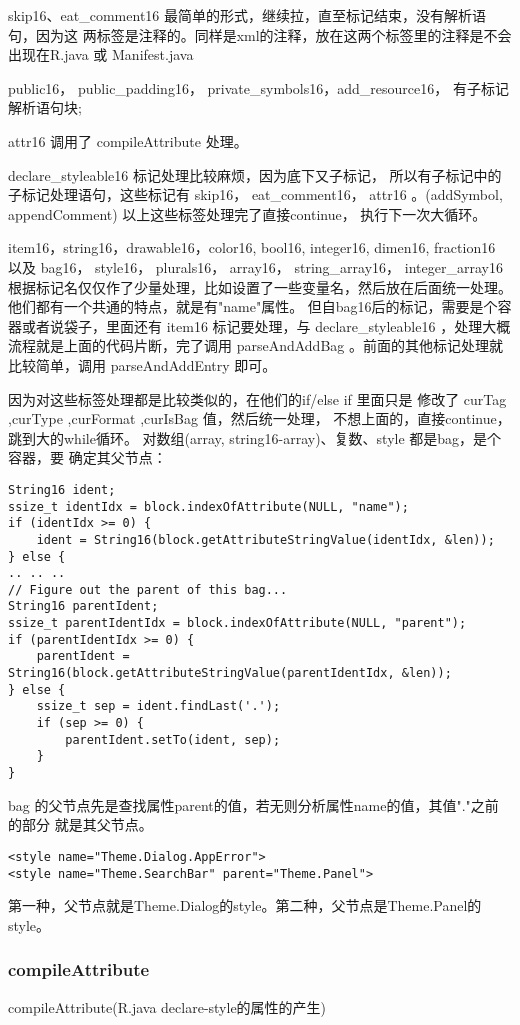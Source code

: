\documentclass[a4paper,11pt]{article}
\begin{document}
skip16、eat_comment16 最简单的形式，继续拉，直至标记结束，没有解析语句，因为这
两标签是注释的。同样是xml的注释，放在这两个标签里的注释是不会出现在R.java 或 Manifest.java
\par
public16， public_padding16， private_symbols16，add_resource16，
有子标记解析语句块;
\par attr16 调用了 compileAttribute 处理。
\par declare_styleable16 标记处理比较麻烦，因为底下又子标记，
所以有子标记中的子标记处理语句，这些标记有
skip16， eat_comment16， attr16 。(addSymbol, appendComment) 
以上这些标签处理完了直接continue， 执行下一次大循环。
\par
item16，string16，drawable16，color16, bool16, integer16, dimen16,
fraction16 以及 bag16， style16， plurals16， array16， string_array16，
integer_array16
根据标记名仅仅作了少量处理，比如设置了一些变量名，然后放在后面统一处理。他们都有一个共通的特点，就是有"name"属性。
但自bag16后的标记，需要是个容器或者说袋子，里面还有 item16
标记要处理，与 declare_styleable16 ，处理大概流程就是上面的代码片断，完了调用 parseAndAddBag
。前面的其他标记处理就比较简单，调用 parseAndAddEntry 即可。

因为对这些标签处理都是比较类似的，在他们的if/else if 里面只是
修改了 curTag ,curType ,curFormat ,curIsBag 值，然后统一处理，
不想上面的，直接continue，跳到大的while循环。
对数组(array, string16-array)、复数、style 都是bag，是个容器，要
确定其父节点：
\begin{lstlisting}
String16 ident;
ssize_t identIdx = block.indexOfAttribute(NULL, "name");
if (identIdx >= 0) {
    ident = String16(block.getAttributeStringValue(identIdx, &len));
} else {
.. .. ..
// Figure out the parent of this bag...
String16 parentIdent;
ssize_t parentIdentIdx = block.indexOfAttribute(NULL, "parent");
if (parentIdentIdx >= 0) {
    parentIdent = String16(block.getAttributeStringValue(parentIdentIdx, &len));
} else {
    ssize_t sep = ident.findLast('.');
    if (sep >= 0) {
        parentIdent.setTo(ident, sep);
    }
}
\end{lstlisting}
bag 的父节点先是查找属性parent的值，若无则分析属性name的值，其值"."之前的部分
就是其父节点。
\begin{lstlisting}
<style name="Theme.Dialog.AppError">
<style name="Theme.SearchBar" parent="Theme.Panel">
\end{lstlisting}
第一种，父节点就是Theme.Dialog的style。第二种，父节点是Theme.Panel的style。

\subsubsection{compileAttribute}
compileAttribute(R.java declare-style的属性的产生)
\end{document}
